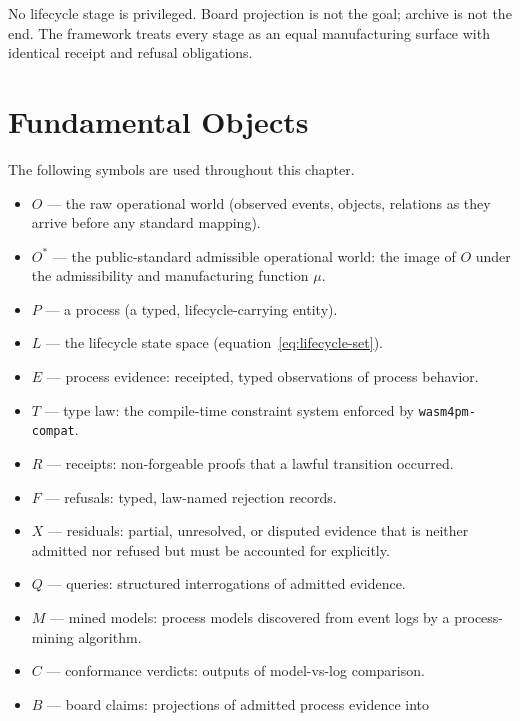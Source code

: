 No lifecycle stage is privileged. Board projection is not the goal; archive is
not the end. The framework treats every stage as an equal manufacturing surface
with identical receipt and refusal obligations.

\section{Fundamental Objects}
\label{sec:pi-objects}

\begin{definition}
\label{def:symbols}
The following symbols are used throughout this chapter.
\begin{itemize}
  \item $O$ --- the raw operational world (observed events, objects, relations
    as they arrive before any standard mapping).
  \item $O^*$ --- the public-standard admissible operational world: the image
    of $O$ under the admissibility and manufacturing function $\mu$.
  \item $P$ --- a process (a typed, lifecycle-carrying entity).
  \item $L$ --- the lifecycle state space (equation~\ref{eq:lifecycle-set}).
  \item $E$ --- process evidence: receipted, typed observations of process
    behavior.
  \item $T$ --- type law: the compile-time constraint system enforced by
    \texttt{wasm4pm-compat}.
  \item $R$ --- receipts: non-forgeable proofs that a lawful transition
    occurred.
  \item $F$ --- refusals: typed, law-named rejection records.
  \item $X$ --- residuals: partial, unresolved, or disputed evidence that is
    neither admitted nor refused but must be accounted for explicitly.
  \item $Q$ --- queries: structured interrogations of admitted evidence.
  \item $M$ --- mined models: process models discovered from event logs by a
    process-mining algorithm.
  \item $C$ --- conformance verdicts: outputs of model-vs-log comparison.
  \item $B$ --- board claims: projections of admitted process evidence into

\end{itemize}
\end{definition}
